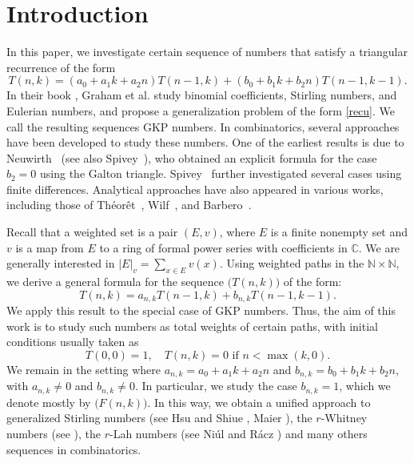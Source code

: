 \documentclass[12pt,a4paper]{article}
\theoremstyle{definition} %
\theoremstyle{remark}
\theoremstyle{examples}
\newcommand{\suit}[1]{{#1}(n,k)}
\newcommand{\coul}[1]{#1_{n,k}}
\newcommand{\nkid}{}
\begin{document}
	
	
	\section{Introduction }
	\noindent	In this paper, we investigate certain sequence of numbers that satisfy a triangular recurrence of the form 
		\begin{equation}\label{recu}
		\suit{T}=(a_0+a_1k+a_2n)T(n-1,k)+(b_0+b_1k+b_2n)T(n-1,k-1).
		\end{equation}
		In their book \cite{GrahamKnuthPatashnik1994}, Graham et al. study binomial coefficients, Stirling numbers, and Eulerian numbers, and propose a generalization problem of the form \eqref{recu}. We call the resulting sequences GKP numbers. In combinatorics, several approaches have been developed to study these numbers. One of the earliest results is due to Neuwirth~\cite{neuwirth2001} (see also Spivey~\cite{Spivey2011JIS}), who obtained an explicit formula for the case $b_2=0$ using the Galton triangle. Spivey~\cite{Spivey2011JIS} further investigated several cases using finite differences. Analytical approaches have also appeared in various works, including those of Théorêt~\cite{theoret1994hyperbinomiales}, Wilf~\cite{wilf2004}, and Barbero~\cite{BARBEROG2014146}.
		
	
		Recall that a weighted set is a pair $(E,v)$, where $E$ is a finite nonempty set and $v$ is a map from $E$ to a ring of formal power series with coefficients in $\mathbb{C}$. We are generally interested in $|E|_v=\sum_{x\in E}v(x)$. 
		Using weighted paths in the  $\mathbb{N}\times\mathbb{N}$, we derive a general formula for the sequence $\big(\suit{T}\big)\nkid$ of the form:
		\begin{equation}
		\label{recu2}
		\suit{T}=\coul{a}T(n-1,k)+\coul{b}T(n-1,k-1).
		\end{equation}
 We apply this result to the special case of GKP numbers.
 Thus, the aim of this work is to study such numbers as total weights of certain paths, with initial conditions usually taken as
	\begin{equation}\label{condiusue}
	T(0,0)=1, \quad \suit{T}=0 \text{ if } n<\max(k,0).
	\end{equation}
	We remain in the setting where $a_{n,k}=a_0+a_1k+a_2n$ and $b_{n,k}=b_0+b_1k+b_2n$, with $a_{n,k}\neq 0$ and $b_{n,k}\neq 0$. In particular, we study the case  $\coul{b}=1$, which we denote mostly by $\big(F(n,k)\big)\nkid$.  In this way, we obtain a unified approach to generalized Stirling numbers (see Hsu and Shiue \cite{hsu1998unified}, Maier \cite{Maier2023}), the $r$-Whitney numbers (see \cite{Mezo2010Bernoulli}),  the $r$-Lah numbers (see Ni\'ul and R\'acz \cite{Niul-Racz}) and many others sequences in combinatorics.
	
\end{document}
